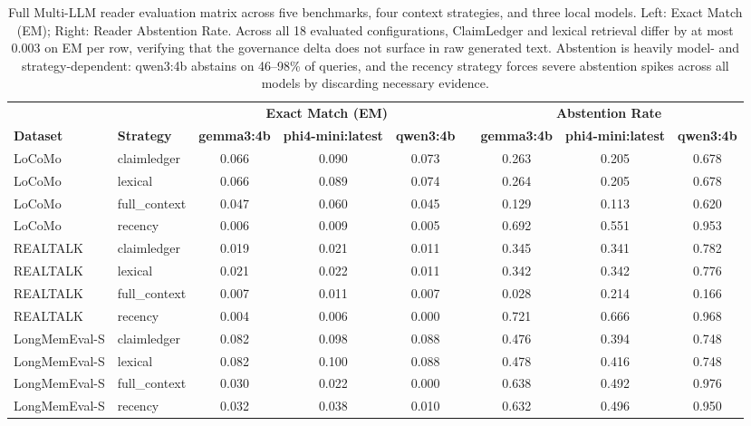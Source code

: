\begin{table}[!t]
\centering
\caption{Full Multi-LLM reader evaluation matrix across five benchmarks, four context strategies, and three local models. Left: Exact Match (EM); Right: Reader Abstention Rate. Across all 18 evaluated configurations, ClaimLedger and lexical retrieval differ by at most 0.003 on EM per row, verifying that the governance delta does not surface in raw generated text. Abstention is heavily model- and strategy-dependent: qwen3:4b abstains on 46--98\% of queries, and the recency strategy forces severe abstention spikes across all models by discarding necessary evidence.}
\label{tab:multillm-full-matrix}
\footnotesize
\begin{tabular*}{\textwidth}{@{\extracolsep{\fill}}ll ccc c ccc@{}}
\toprule
& & \multicolumn{3}{c}{\textbf{Exact Match (EM)}} & & \multicolumn{3}{c}{\textbf{Abstention Rate}} \\
\cmidrule{3-5} \cmidrule{7-9}
\textbf{Dataset} & \textbf{Strategy} & \textbf{gemma3:4b} & \textbf{phi4-mini:latest} & \textbf{qwen3:4b} & & \textbf{gemma3:4b} & \textbf{phi4-mini:latest} & \textbf{qwen3:4b} \\
\midrule
LoCoMo & claimledger & 0.066 & 0.090 & 0.073 & & 0.263 & 0.205 & 0.678 \\
LoCoMo & lexical & 0.066 & 0.089 & 0.074 & & 0.264 & 0.205 & 0.678 \\
LoCoMo & full\_context & 0.047 & 0.060 & 0.045 & & 0.129 & 0.113 & 0.620 \\
LoCoMo & recency & 0.006 & 0.009 & 0.005 & & 0.692 & 0.551 & 0.953 \\
\midrule
REALTALK & claimledger & 0.019 & 0.021 & 0.011 & & 0.345 & 0.341 & 0.782 \\
REALTALK & lexical & 0.021 & 0.022 & 0.011 & & 0.342 & 0.342 & 0.776 \\
REALTALK & full\_context & 0.007 & 0.011 & 0.007 & & 0.028 & 0.214 & 0.166 \\
REALTALK & recency & 0.004 & 0.006 & 0.000 & & 0.721 & 0.666 & 0.968 \\
\midrule
LongMemEval-S & claimledger & 0.082 & 0.098 & 0.088 & & 0.476 & 0.394 & 0.748 \\
LongMemEval-S & lexical & 0.082 & 0.100 & 0.088 & & 0.478 & 0.416 & 0.748 \\
LongMemEval-S & full\_context & 0.030 & 0.022 & 0.000 & & 0.638 & 0.492 & 0.976 \\
LongMemEval-S & recency & 0.032 & 0.038 & 0.010 & & 0.632 & 0.496 & 0.950 \\

\end{tabular*}
\end{table}
